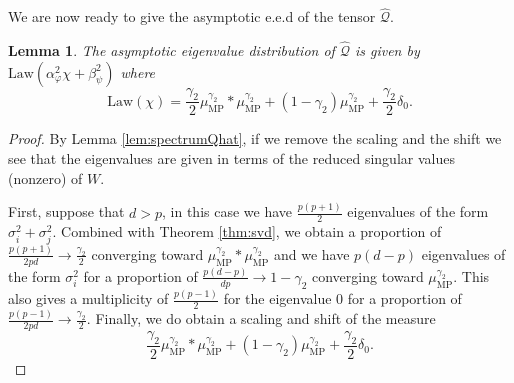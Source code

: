 \documentclass[letterpaper, 10pt, dvipsnames]{article}
\numberwithin{equation}{section}
\newcommand{\Q}{\mathcal{Q}}
\renewcommand{\phi}{\varphi}
\renewcommand{\hat}{\widehat}
\newtheorem{lem}[ccounter]{Lemma}
\theoremstyle{definition}
\begin{document}
We are now ready to give the asymptotic e.e.d of the tensor $\hat{\Q}$.
\begin{lem}
  The asymptotic eigenvalue distribution of $\hat{\Q}$ is given by $\mathrm{Law}(\alpha_\phi^2 \chi +\beta_\psi^2)$ where 
  \[
  \mathrm{Law}(\chi) 
  = \frac{\gamma_2}{2}\mu_{\mathrm{MP}}^{\gamma_2}\ast \mu_{\mathrm{MP}}^{\gamma_2}
  +
  (1-\gamma_2)\mu_{\mathrm{MP}}^{\gamma_2}
  +
  \frac{\gamma_2}{2}\delta_0.
  \]
\end{lem}
\begin{proof}
  By Lemma \ref{lem:spectrumQhat}, if we remove the scaling and the shift we see that the eigenvalues are given in terms of the reduced singular values (nonzero) of $W$. 
  
  First, suppose that $d>p$, in this case we have $\frac{p(p+1)}{2}$ eigenvalues of the form $\sigma_i^2+\sigma_j^2$. Combined with Theorem \ref{thm:svd}, we obtain a proportion of $\frac{p(p+1)}{2pd}\to \frac{\gamma_2}{2}$ converging toward $\mu_{\mathrm{MP}}^{\gamma_2}\ast \mu_{\mathrm{MP}}^{\gamma_2}$ and we have $p(d-p)$ eigenvalues of the form $\sigma_i^2$ for a proportion of $\frac{p(d-p)}{dp}\to 1-\gamma_2$ converging toward $\mu_{\mathrm{MP}}^{\gamma_2}$. This also gives a multiplicity of $\frac{p(p-1)}{2}$ for the eigenvalue 0 for a proportion of $\frac{p(p-1)}{2pd}\to\frac{\gamma_2}{2}$. Finally, we do obtain a scaling and shift of the measure 
  \[
   \frac{\gamma_2}{2}\mu_{\mathrm{MP}}^{\gamma_2}\ast \mu_{\mathrm{MP}}^{\gamma_2}
  +
  (1-\gamma_2)\mu_{\mathrm{MP}}^{\gamma_2}
  +
  \frac{\gamma_2}{2}\delta_0.
  \]
  

\end{proof}
\end{document}
